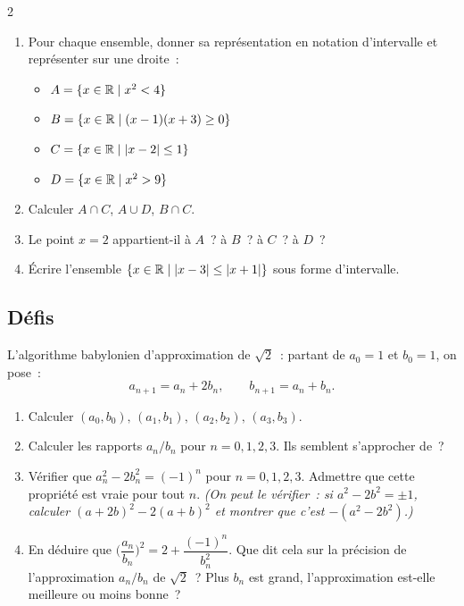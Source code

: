 \begin{probleme}{2}
\begin{enumerate}
  \item Pour chaque ensemble, donner sa repr\'esentation en notation d'intervalle
        et repr\'esenter sur une droite~:
        \begin{itemize}
          \item $A = \{x \in \mathbb{R} \mid x^2 < 4\}$
          \item $B = \{x \in \mathbb{R} \mid (x-1)(x+3) \geq 0\}$
          \item $C = \{x \in \mathbb{R} \mid \left|x-2\right| \leq 1\}$
          \item $D = \{x \in \mathbb{R} \mid x^2 > 9\}$
        \end{itemize}
  \item Calculer $A \cap C$, $A \cup D$, $B \cap C$.
  \item Le point $x = 2$ appartient-il \`a $A$~? \`a $B$~? \`a $C$~? \`a $D$~?
  \item \'Ecrire l'ensemble $\{x \in \mathbb{R} \mid \left|x-3\right| \leq \left|x+1\right|\}$
        sous forme d'intervalle.
\end{enumerate}
\end{probleme}

\subsection*{D\'efis}

\begin{challenge}
L'algorithme babylonien d'approximation de $\sqrt{2}$~:
partant de $a_0 = 1$ et $b_0 = 1$, on pose~:
$$a_{n+1} = a_n + 2b_n, \qquad b_{n+1} = a_n + b_n.$$
\begin{enumerate}
  \item Calculer $(a_0,b_0),\,(a_1,b_1),\,(a_2,b_2),\,(a_3,b_3)$.
  \item Calculer les rapports $a_n/b_n$ pour $n=0,1,2,3$.
        Ils semblent s'approcher de~?
  \item V\'erifier que $a_n^2 - 2b_n^2 = (-1)^n$ pour $n=0,1,2,3$.
        Admettre que cette propri\'et\'e est vraie pour tout $n$.
        \emph{(On peut le v\'erifier~: si $a^2-2b^2=\pm1$, calculer
        $(a+2b)^2 - 2(a+b)^2$ et montrer que c'est $-(a^2-2b^2)$.)}
  \item En d\'eduire que $\bigl(\dfrac{a_n}{b_n}\bigr)^2 = 2 + \dfrac{(-1)^n}{b_n^2}$.
        Que dit cela sur la pr\'ecision de l'approximation $a_n/b_n$ de $\sqrt{2}$~?
        Plus $b_n$ est grand, l'approximation est-elle meilleure ou moins bonne~?
\end{enumerate}
\end{challenge}

